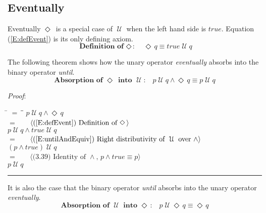 \documentclass[12pt, fleqn, leqno]{article}
\newcommand{\lgap}{2pt}                             %
\newcommand{\mymathindent}{24pt}                    %
\newcommand{\Until}{\;\mathcal{U}\;}
\newcommand{\Event}{\Diamond\,}
\newcommand{\myqed}{\rule[-.23ex]{1.2ex}{2.0ex}}
\newcommand{\myqedtab}{\hspace{384pt}}              %
\newcommand{\Gll} {\langle}                         %
\newcommand{\Ggg} {\rangle}                         %
\newcommand{\Hint}[1]     {\ \ \ $\Gll              \mbox{#1} \Ggg$ }   %
\begin{document}
\subsection{Eventually}\label{section-event}

Eventually $\Event$ is a special case of $\Until$ when the left hand side is $true$.
Equation (\ref{E:defEvent}) is its only defining axiom.
\begin{equation}\label{E:defEvent}
\textbf{Definition of $\Event$:}\quad \Event q \equiv true \Until q
\end{equation}

The following theorem shows how the unary operator \textit{eventually} absorbs into the binary operator \textit{until}.
\begin{equation}\label{E:absEventIntoUntil}
\textbf{Absorption of $\Event$ into $\Until$:}\quad p \Until q\land \Event q \equiv p\Until q
\end{equation}

\emph{Proof}:
\begin{tabbing}
\hspace{\mymathindent} \= $= \;$ \= \myqedtab \= \kill
  \> \>   $p \Until q\land \Event q$\\[\lgap]
  \> $=$  \>  \Hint{(\ref{E:defEvent}) Definition of $\Event$}\\[\lgap]
  \> \>   $p \Until q\land true\Until q$\\[\lgap]
  \> $=$  \>  \Hint{(\ref{E:untilAndEquiv}) Right distributivity of $\Until$ over $\land$}\\[\lgap]
  \> \>   $(p\land true) \Until q$\\[\lgap]
  \> $=$  \>  \Hint{(3.39) Identity of $\land$, $p\land true\equiv p$}\\[\lgap]
  \> \>   $p\Until q$ \quad \myqed
\end{tabbing}

It is also the case that the binary operator \textit{until} absorbs into the unary operator \textit{eventually}.
\begin{equation}\label{E:absUntilIntoEvent}
\textbf{Absorption of $\Until$ into $\Event$:}\quad p \Until \Event q \equiv \Event q
\end{equation}
\end{document}
